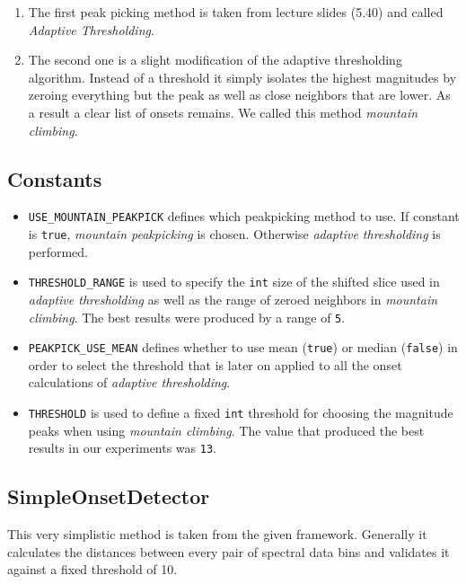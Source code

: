 \begin{enumerate}
  \item The first peak picking method is taken from lecture slides (5.40) and
  called \emph{Adaptive Thresholding}.
  \item The second one is a slight modification of the adaptive thresholding
  algorithm. Instead of a threshold it simply isolates the highest magnitudes by
  zeroing everything but the peak as well as close neighbors that are lower. As
  a result a clear list of onsets remains. We called this method \emph{mountain
  climbing}.
\end{enumerate}

\subsection*{Constants} \label{ssec:onsetconstants}
\begin{itemize}
  \item \texttt{USE\_MOUNTAIN\_PEAKPICK} defines which peakpicking method to
  use. If constant is \texttt{true}, \emph{mountain peakpicking} is chosen.
  Otherwise \emph{adaptive thresholding} is performed.
  \item \texttt{THRESHOLD\_RANGE} is used to specify the \texttt{int} size of
  the shifted slice used in \emph{adaptive thresholding} as well as the range of
  zeroed neighbors in \emph{mountain climbing}. The best results were produced
  by a range of \texttt{5}.
  \item \texttt{PEAKPICK\_USE\_MEAN} defines whether to use mean
  (\texttt{true}) or median (\texttt{false}) in order to select the threshold
  that is later on applied to all the onset calculations of \emph{adaptive
  thresholding}.
  \item \texttt{THRESHOLD} is used to define a fixed \texttt{int} threshold for
  choosing the magnitude peaks when using \emph{mountain climbing}. The value
  that produced the best results in our experiments was \texttt{13}. 
\end{itemize}

\subsection{\ttfamily SimpleOnsetDetector} \label{ssec:onsetsimple}
This very simplistic method is taken from the given framework. Generally it
calculates the distances between every pair of spectral data bins and validates
it against a fixed threshold of 10.

